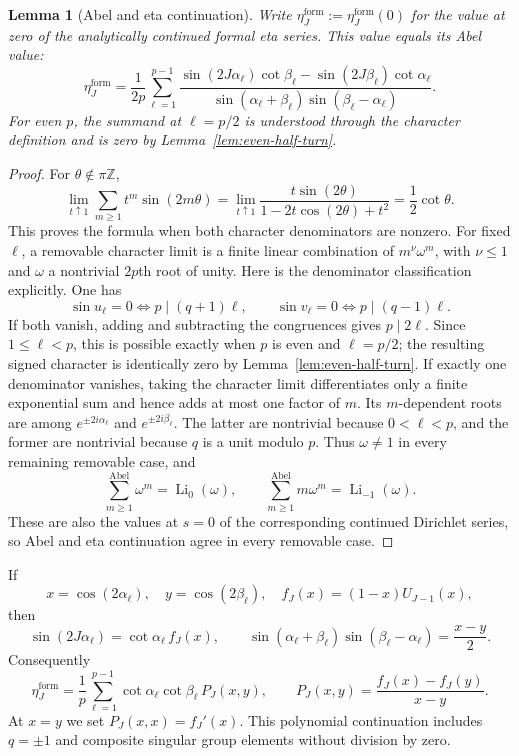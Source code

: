 \documentclass[11pt]{article}
\newtheorem{lemma}[theorem]{Lemma}
\theoremstyle{definition}
\newcommand{\Z}{\mathbb Z}
\begin{document}
\begin{lemma}[Abel and eta continuation]
\label{lem:abel-eta}
Write $\eta_J^{\mathrm{form}}:=\eta_J^{\mathrm{form}}(0)$ for the value at
zero of the analytically continued formal eta series.  This value equals its
Abel value:
\begin{equation}
 \eta_J^{\mathrm{form}}
 =\frac1{2p}\sum_{\ell=1}^{p-1}
 \frac{
 \sin(2J\alpha_\ell)\cot\beta_\ell
 -\sin(2J\beta_\ell)\cot\alpha_\ell}
 {\sin(\alpha_\ell+\beta_\ell)
  \sin(\beta_\ell-\alpha_\ell)}.
 \label{eq:formal-abel-eta}
\end{equation}
For even $p$, the summand at $\ell=p/2$ is understood through the character
definition and is zero by Lemma~\ref{lem:even-half-turn}.
\end{lemma}

\begin{proof}
For $\theta\notin\pi\Z$,
\[
 \lim_{t\uparrow1}\sum_{m\geq1}t^m\sin(2m\theta)
 =\lim_{t\uparrow1}
 \frac{t\sin(2\theta)}{1-2t\cos(2\theta)+t^2}
 =\frac12\cot\theta.
\]
This proves the formula when both character denominators are nonzero.  For
fixed $\ell$, a removable character limit is a finite linear combination of
$m^\nu\omega^m$, with $\nu\leq1$ and $\omega$ a nontrivial $2p$th root of
unity.  Here is the denominator classification explicitly.  One has
\[
 \sin u_\ell=0\Longleftrightarrow
 p\mid(q+1)\ell,\qquad
 \sin v_\ell=0\Longleftrightarrow
 p\mid(q-1)\ell.
\]
If both vanish, adding and subtracting the congruences gives
$p\mid2\ell$.  Since $1\leq\ell<p$, this is possible exactly when $p$ is
even and $\ell=p/2$; the resulting signed character is identically zero by
Lemma~\ref{lem:even-half-turn}.  If exactly one denominator vanishes, taking
the character limit differentiates only a finite exponential sum and hence
adds at most one factor of $m$.  Its $m$-dependent roots are among
$e^{\pm2i\alpha_\ell}$ and $e^{\pm2i\beta_\ell}$.  The latter are nontrivial
because $0<\ell<p$, and the former are nontrivial because $q$ is a unit
modulo $p$.  Thus $\omega\neq1$ in every remaining removable case, and
\[
 \sum_{m\geq1}^{\mathrm{Abel}}\omega^m=\operatorname{Li}_0(\omega),
 \qquad
 \sum_{m\geq1}^{\mathrm{Abel}}m\omega^m
 =\operatorname{Li}_{-1}(\omega).
\]
These are also the values at $s=0$ of the corresponding continued Dirichlet
series, so Abel and eta continuation agree in every removable case.
\end{proof}

If
\[
 x=\cos(2\alpha_\ell),\quad y=\cos(2\beta_\ell),\quad
 f_J(x)=(1-x)U_{J-1}(x),
\]
then
\[
 \sin(2J\alpha_\ell)=\cot\alpha_\ell\,f_J(x),\qquad
 \sin(\alpha_\ell+\beta_\ell)
 \sin(\beta_\ell-\alpha_\ell)=\frac{x-y}{2}.
\]
Consequently
\begin{equation}
 \eta_J^{\mathrm{form}}
 =\frac1p\sum_{\ell=1}^{p-1}
 \cot\alpha_\ell\cot\beta_\ell\,P_J(x,y),
 \qquad
 P_J(x,y)=\frac{f_J(x)-f_J(y)}{x-y}.
 \label{eq:formal-polynomial-kernel}
\end{equation}
At $x=y$ we set $P_J(x,x)=f_J'(x)$.  This polynomial continuation includes
$q=\pm1$ and composite singular group elements without division by zero.
\end{document}
